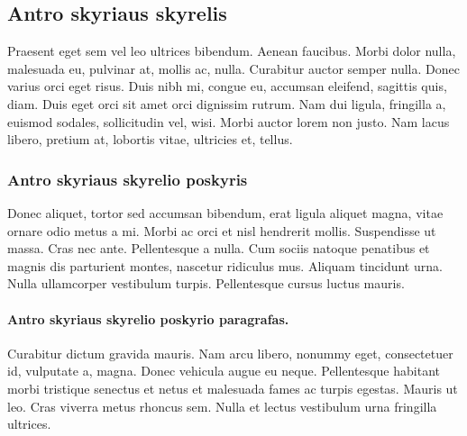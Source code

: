 \documentclass[a4paper, 12pt]{article}
\begin{document}
\subsection{Antro skyriaus skyrelis}
%
Praesent eget sem vel leo ultrices bibendum. Aenean faucibus. Morbi dolor 
nulla, malesuada eu, pulvinar at, mollis ac, nulla. Curabitur auctor semper 
nulla. Donec varius orci eget risus. Duis nibh mi, congue eu, accumsan 
eleifend, sagittis quis, diam. Duis eget orci sit amet orci dignissim rutrum. 
Nam dui ligula, fringilla a, euismod sodales, sollicitudin vel, wisi. Morbi 
auctor lorem non justo. Nam lacus libero, pretium at, lobortis vitae, 
ultricies et, tellus. 
%
\subsubsection{Antro skyriaus skyrelio poskyris}
%
Donec aliquet, tortor sed accumsan bibendum, erat ligula aliquet magna, vitae 
ornare odio metus a mi. Morbi ac orci et nisl hendrerit mollis. Suspendisse 
ut massa. Cras nec ante. Pellentesque a nulla. Cum sociis natoque penatibus 
et magnis dis parturient montes, nascetur ridiculus mus. Aliquam tincidunt 
urna. Nulla ullamcorper vestibulum turpis. Pellentesque cursus luctus mauris.
%
\paragraph{Antro skyriaus skyrelio poskyrio paragrafas.}
%
Curabitur dictum gravida mauris. Nam arcu libero, nonummy eget, consectetuer 
id, vulputate a, magna. Donec vehicula augue eu neque. Pellentesque habitant 
morbi tristique senectus et netus et malesuada fames ac turpis egestas. 
Mauris ut leo. Cras viverra metus rhoncus sem. Nulla et lectus vestibulum 
urna fringilla ultrices. 
%
%
\newpage
\end{document}
